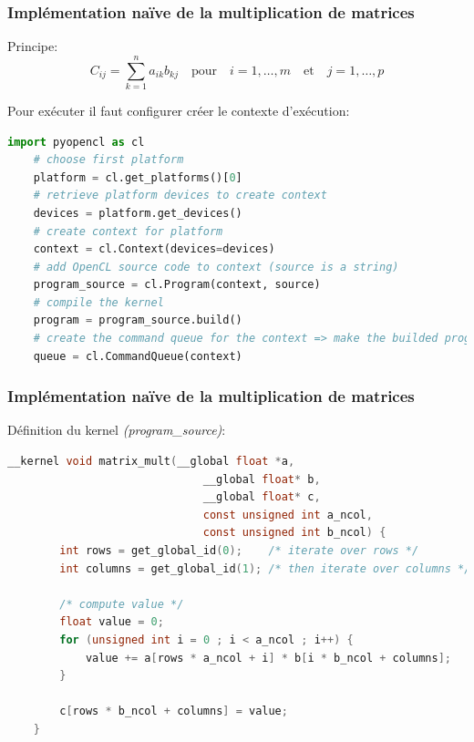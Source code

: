\begin{frame}[fragile]
    \frametitle{Implémentation naïve de la multiplication de matrices}
    Principe:
    \[
        C_{ij} = \sum_{k=1}^{n} a_{ik}b_{kj}\quad\textrm{pour}\quad i = 1, \dots, m\quad \textrm{et}\quad j = 1,\dots,p
    \]\pause{}

    Pour exécuter il faut configurer créer le contexte d'exécution:\pause{}
    \begin{lstlisting}[language=Python]
    import pyopencl as cl
    # choose first platform 
    platform = cl.get_platforms()[0]       
    # retrieve platform devices to create context
    devices = platform.get_devices()        
    # create context for platform
    context = cl.Context(devices=devices)    
    # add OpenCL source code to context (source is a string)
    program_source = cl.Program(context, source)
    # compile the kernel
    program = program_source.build()
    # create the command queue for the context => make the builded programs avaiable for execution
    queue = cl.CommandQueue(context)
    \end{lstlisting}
\end{frame}

\begin{frame}[fragile]
    \frametitle{Implémentation naïve de la multiplication de matrices}
    Définition du kernel \textit{(program\_source)}:
    \begin{lstlisting}[language=c]
    __kernel void matrix_mult(__global float *a,
                              __global float* b,
                              __global float* c,
                              const unsigned int a_ncol,
                              const unsigned int b_ncol) {
        int rows = get_global_id(0);    /* iterate over rows */
        int columns = get_global_id(1); /* then iterate over columns */

        /* compute value */
        float value = 0;
        for (unsigned int i = 0 ; i < a_ncol ; i++) {
            value += a[rows * a_ncol + i] * b[i * b_ncol + columns];
        }

        c[rows * b_ncol + columns] = value;
    }
    \end{lstlisting} 
\end{frame}


